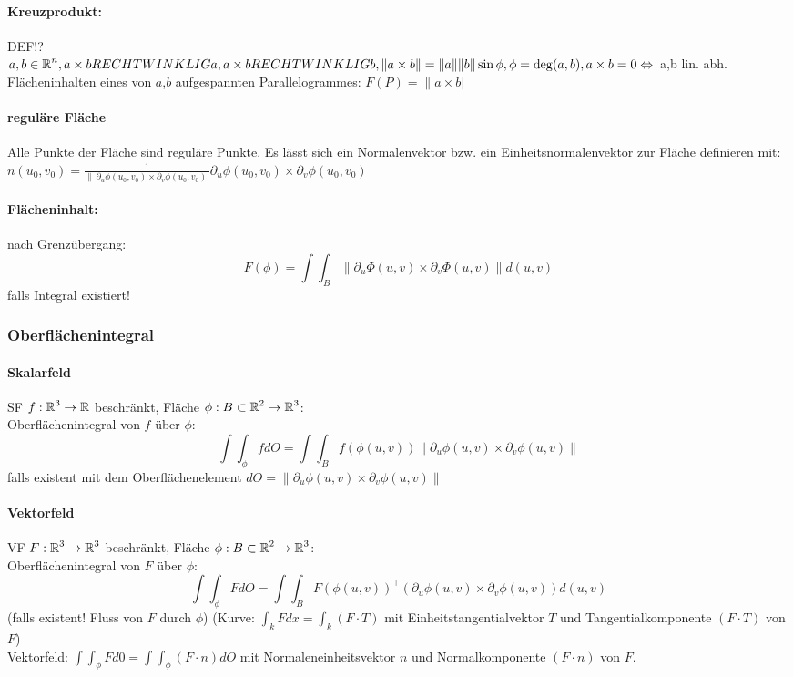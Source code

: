 \documentclass[german]{latex4ei/latex4ei_sheet}
\begin{document}
\paragraph{Kreuzprodukt:}
DEF!?\\
$a,b \in \operatorname{\mathbb R}^n, a \times b RECHTWINKLIG a, a \times b RECHTWINKLIG b, \|a \times b \|=\|a\|\|b\| \sin \phi, \phi = \deg(a,b), a \times b = 0 \Leftrightarrow $ a,b lin. abh.\\
Fl\"acheninhalten eines von $a$,$b$ aufgespannten Parallelogrammes: $F(P)=\|a \times b|$

\paragraph{regul\"are Fl\"ache}
Alle Punkte der Fl\"ache sind regul\"are Punkte. Es l\"asst sich ein Normalenvektor bzw. ein Einheitsnormalenvektor zur Fl\"ache definieren mit: $n(u_0,v_0)=\frac{1}{\|\  \partial_u \phi(u_0,v_0) \times \partial_v \phi(u_0,v_0)  |}\partial_u \phi(u_0,v_0) \times \partial_v \phi(u_0,v_0)$

\paragraph{Fl\"acheninhalt:}
nach Grenz\"ubergang:\\
\[F(\phi)=\int \int_B \| \partial_u \Phi(u,v) \times \partial_v \Phi(u,v)\| d(u,v)\] falls Integral existiert!	


\subsubsection{Oberfl\"achenintegral}
\paragraph{Skalarfeld}
SF $f: \operatorname{\mathbb R}^3 \to \operatorname{\mathbb R}$ beschr\"ankt, Fl\"ache $\phi: B \subset \operatorname{\mathbb R}^2 \to \operatorname{\mathbb R}^3$:\\
Oberfl\"achenintegral von $f$ \"uber $\phi$:
\[\int \int_\phi f d O = \int \int_B f(\phi(u,v)) \|\partial_u \phi(u,v) \times \partial_v \phi(u,v)\|\] falls existent mit dem Oberfl\"achenelement $d O=\|\partial_u \phi(u,v) \times \partial_v \phi(u,v)\|$\\

\paragraph{Vektorfeld}
VF $F:\operatorname{\mathbb R}^3 \to \operatorname{\mathbb R}^3$ beschr\"ankt, Fl\"ache $\phi: B \subset \operatorname{\mathbb R}^2 \to \operatorname{\mathbb R}^3$:\\
Oberfl\"achenintegral von $F$ \"uber $\phi$:
\[\int \int_\phi F d O=\int \int_B F(\phi(u,v))^\top (\partial_u \phi(u,v) \times \partial_v \phi(u,v))d(u,v)\] (falls existent! Fluss von $F$ durch $\phi$)
(Kurve: $\int_k F d x = \int_k (F \cdot T)$ mit Einheitstangentialvektor $T$ und Tangentialkomponente $(F \cdot T)$ von $F$)\\
Vektorfeld: $\int \int_\phi F d 0=\int \int_\phi (F \cdot n) d O$ mit Normaleneinheitsvektor $n$ und Normalkomponente $(F \cdot n)$ von $F$.
\end{document}
